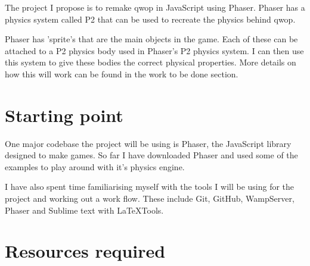 \documentclass[12pt,a4paper,twoside]{article}
\begin{document}

The project I propose is to remake qwop in JavaScript using Phaser. Phaser has a physics system called P2 that can be used to recreate the physics behind qwop.

Phaser has 'sprite's that are the main objects in the game. Each of these can be attached to a P2 physics body used in Phaser's P2 physics system. I can then use this system to give these bodies the correct physical properties.
More details on how this will work can be found in the work to be done section.


 

\section*{Starting point}


One major codebase the project will be using is Phaser, the JavaScript library designed to make games.
So far I have downloaded Phaser and used some of the examples to play around with it's physics engine.

I have also spent time familiarising myself with the tools I will be using for the project and working out a work flow. These include Git, GitHub, WampServer, Phaser and Sublime text with LaTeXTools.

\section*{Resources required}
\end{document}
